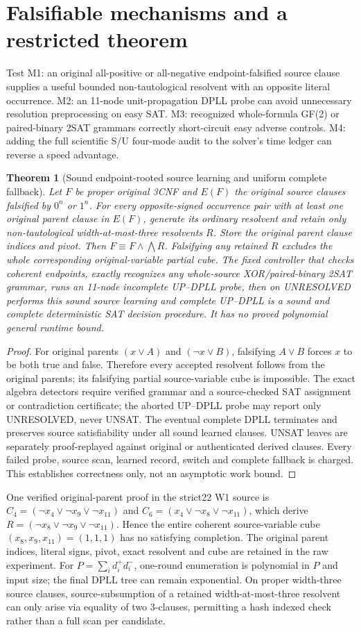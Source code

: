 \documentclass[11pt]{article}
\newtheorem{theorem}{Theorem}
\begin{document}
\section{Falsifiable mechanisms and a restricted theorem}
Test M1: an original all-positive or all-negative endpoint-falsified source clause supplies a useful bounded non-tautological resolvent with an opposite literal occurrence. M2: an 11-node unit-propagation DPLL probe can avoid unnecessary resolution preprocessing on easy SAT. M3: recognized whole-formula GF(2) or paired-binary 2SAT grammars correctly short-circuit easy adverse controls. M4: adding the full scientific S/U four-mode audit to the solver's time ledger can reverse a speed advantage.
\begin{theorem}[Sound endpoint-rooted source learning and uniform complete fallback]
Let $F$ be proper original 3CNF and $E(F)$ the original source clauses falsified by $0^n$ or $1^n$. For every opposite-signed occurrence pair with at least one original parent clause in $E(F)$, generate its ordinary resolvent and retain only non-tautological width-at-most-three resolvents $R$. Store the original parent clause indices and pivot. Then $F\equiv F\wedge\bigwedge R$. Falsifying any retained $R$ excludes the whole corresponding original-variable partial cube. The fixed controller that checks coherent endpoints, exactly recognizes any whole-source XOR/paired-binary 2SAT grammar, runs an 11-node incomplete UP--DPLL probe, then on UNRESOLVED performs this sound source learning and complete UP--DPLL is a sound and complete deterministic SAT decision procedure. It has no proved polynomial general runtime bound.
\end{theorem}
\begin{proof}
For original parents $(x\vee A)$ and $(\neg x\vee B)$, falsifying $A\vee B$ forces $x$ to be both true and false. Therefore every accepted resolvent follows from the original parents; its falsifying partial source-variable cube is impossible. The exact algebra detectors require verified grammar and a source-checked SAT assignment or contradiction certificate; the aborted UP--DPLL probe may report only UNRESOLVED, never UNSAT. The eventual complete DPLL terminates and preserves source satisfiability under all sound learned clauses. UNSAT leaves are separately proof-replayed against original or authenticated derived clauses. Every failed probe, source scan, learned record, switch and complete fallback is charged. This establishes correctness only, not an asymptotic work bound.
\end{proof}
One verified original-parent proof in the strict22 W1 source is $C_4=(\neg x_4\vee\neg x_9\vee\neg x_{11})$ and $C_6=(x_4\vee\neg x_8\vee\neg x_{11})$, which derive $R=(\neg x_8\vee\neg x_9\vee\neg x_{11})$. Hence the entire coherent source-variable cube $(x_8,x_9,x_{11})=(1,1,1)$ has no satisfying completion. The original parent indices, literal signs, pivot, exact resolvent and cube are retained in the raw experiment. For $P=\sum_i d_i^+d_i^-$, one-round enumeration is polynomial in $P$ and input size; the final DPLL tree can remain exponential. On proper width-three source clauses, source-subsumption of a retained width-at-most-three resolvent can only arise via equality of two 3-clauses, permitting a hash indexed check rather than a full scan per candidate.
\end{document}
